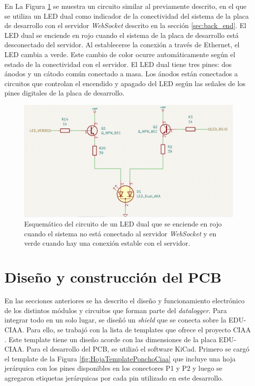 En La Figura \ref{fig:esquemLedStatusSocket} se muestra un circuito similar al previamente descrito, en el que se utiliza un LED dual como indicador de la conectividad del sistema de la placa de desarrollo con el servidor \textit{WebSocket} descrito en la sección \ref{sec:back_end}. El LED dual se enciende en rojo cuando el sistema de la placa de desarrollo está desconectado del servidor. Al establecerse la conexión a través de Ethernet, el LED cambia a verde. Este cambio de color ocurre automáticamente según el estado de la conectividad con el servidor. El LED dual tiene tres pines: dos ánodos y un cátodo común conectado a masa. Los ánodos están conectados a circuitos que controlan el encendido y apagado del LED según las señales de los pines digitales de la placa de desarrollo.

\begin{figure}[H]
    \centering
    \includegraphics[width=0.9\linewidth]{Figuras/datalogger/Hardware/esquemLedStatusSocket.png}
    \caption{Esquemático del circuito de un LED dual que se enciende en rojo cuando el sistema no está conectado al servidor \textit{WebSocket} y en verde cuando hay una conexión estable con el servidor.}
    \label{fig:esquemLedStatusSocket}
\end{figure}



\section{Diseño y construcción del PCB}

En las secciones anteriores se ha descrito el diseño y funcionamiento electrónico de los distintos módulos y circuitos que forman parte del \textit{datalogger}. Para integrar todo en un solo lugar, se diseñó un \textit{shield} que se conecta sobre la EDU-CIAA. Para ello, se trabajó con la lista de templates que ofrece el proyecto CIAA \cite{CIAA_Ponchos}. Este template tiene un diseño acorde con las dimensiones de la placa EDU-CIAA. Para el desarrollo del PCB, se utilizó el software KiCad. Primero se cargó el template de la Figura \ref{fig:HojaTemplatePonchoCiaa} que incluye una hoja jerárquica con los pines disponibles en los conectores P1 y P2 y luego se agregaron etiquetas jerárquicas por cada pin utilizado en este desarrollo.

